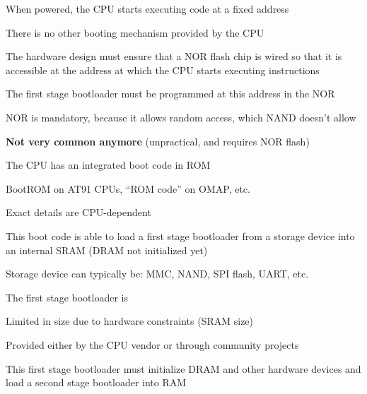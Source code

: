     \startitemize
    \item When powered, the CPU starts executing code at a fixed address
    \item There is no other booting mechanism provided by the CPU
    \item The hardware design must ensure that a NOR flash chip is
      wired so that it is accessible at the address at which the CPU
      starts executing instructions
    \item The first stage bootloader must be programmed at this
      address in the NOR
    \item NOR is mandatory, because it allows random access, which
      NAND doesn't allow
    \item {\bf Not very common anymore} (unpractical, and requires NOR
      flash)
    \stopitemize

  \startitemize
  \item The CPU has an integrated boot code in ROM
    \startitemize
    \item BootROM on AT91 CPUs, “ROM code” on OMAP, etc.
    \item Exact details are CPU-dependent
    \stopitemize
  \item This boot code is able to load a first stage bootloader from a
    storage device into an internal SRAM (DRAM not initialized yet)
    \startitemize
    \item Storage device can typically be: MMC, NAND, SPI flash, UART,
      etc.
    \stopitemize
  \item The first stage bootloader is
    \startitemize
    \item Limited in size due to hardware constraints (SRAM size)
    \item Provided either by the CPU vendor or through community projects
    \stopitemize
  \item This first stage bootloader must initialize DRAM and other
    hardware devices and load a second stage bootloader into RAM
  \stopitemize

